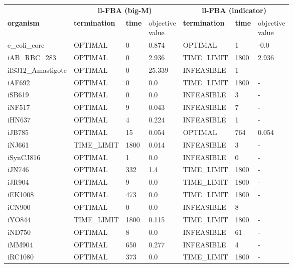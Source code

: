 \begin{table}[!ht]
    \small
    \centering
    \begin{tabular}{@{\extracolsep{4pt}}lllllll@{}}
    \hline
        \multicolumn{1}{c}{} & \multicolumn{3}{c}{\textbf{ll-FBA (big-M)}} & \multicolumn{3}{c}{\textbf{ll-FBA (indicator)}}\\ \cline{2-4} \cline{5-7} 
        \textbf{organism} & \textbf{termination} & \textbf{time} & \thead{objective \\value} & \textbf{termination} & \textbf{time} & \thead{objective \\value} \\ \hline
        e\_coli\_core & OPTIMAL & 0 & 0.874 & OPTIMAL & 1 & -0.0 \\ \hline
        iAB\_RBC\_283 & OPTIMAL & 0 & 2.936 & TIME\_LIMIT & 1800 & 2.936 \\ \hline
        iIS312\_Amastigote & OPTIMAL & 0 & 25.339 & INFEASIBLE & 1 & - \\ \hline
        iAF692 & OPTIMAL & 0 & 0.0 & TIME\_LIMIT & 1800 & - \\ \hline
        iSB619 & OPTIMAL & 0 & 0.0 & INFEASIBLE & 3 & - \\ \hline
        iNF517 & OPTIMAL & 9 & 0.043 & INFEASIBLE & 7 & - \\ \hline
        iHN637 & OPTIMAL & 4 & 0.224 & INFEASIBLE & 1 & - \\ \hline
        iJB785 & OPTIMAL & 15 & 0.054 & OPTIMAL & 764 & 0.054 \\ \hline
        iNJ661 & TIME\_LIMIT & 1800 & 0.014 & INFEASIBLE & 3 & - \\ \hline
        iSynCJ816 & OPTIMAL & 1 & 0.0 & INFEASIBLE & 0 & - \\ \hline
        iJN746 & OPTIMAL & 332 & 1.4 & TIME\_LIMIT & 1800 & - \\ \hline
        iJR904 & OPTIMAL & 9 & 0.0 & TIME\_LIMIT & 1800 & - \\ \hline
        iEK1008 & OPTIMAL & 473 & 0.0 & TIME\_LIMIT & 1800 & - \\ \hline
        iCN900 & OPTIMAL & 0 & 0.0 & INFEASIBLE & 8 & - \\ \hline
        iYO844 & TIME\_LIMIT & 1800 & 0.115 & TIME\_LIMIT & 1800 & - \\ \hline
        iND750 & OPTIMAL & 8 & 0.0 & INFEASIBLE & 61 & - \\ \hline
        iMM904 & OPTIMAL & 650 & 0.277 & INFEASIBLE & 4 & - \\ \hline
        iRC1080 & OPTIMAL & 373 & 0.0 & TIME\_LIMIT & 1800 & - \\ \hline

\end{tabular}
\end{table}
